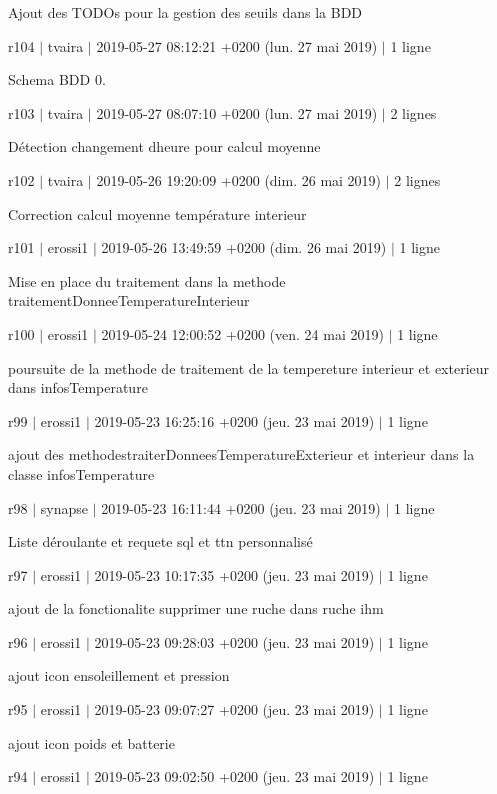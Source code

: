 Ajout des T\+O\+D\+Os pour la gestion des seuils dans la B\+DD

r104 $\vert$ tvaira $\vert$ 2019-\/05-\/27 08\+:12\+:21 +0200 (lun. 27 mai 2019) $\vert$ 1 ligne

Schema B\+DD 0.

r103 $\vert$ tvaira $\vert$ 2019-\/05-\/27 08\+:07\+:10 +0200 (lun. 27 mai 2019) $\vert$ 2 lignes

Détection changement d\textquotesingle{}heure pour calcul moyenne

r102 $\vert$ tvaira $\vert$ 2019-\/05-\/26 19\+:20\+:09 +0200 (dim. 26 mai 2019) $\vert$ 2 lignes

Correction calcul moyenne température interieur

r101 $\vert$ erossi1 $\vert$ 2019-\/05-\/26 13\+:49\+:59 +0200 (dim. 26 mai 2019) $\vert$ 1 ligne

Mise en place du traitement dans la methode traitement\+Donnee\+Temperature\+Interieur

r100 $\vert$ erossi1 $\vert$ 2019-\/05-\/24 12\+:00\+:52 +0200 (ven. 24 mai 2019) $\vert$ 1 ligne

poursuite de la methode de traitement de la tempereture interieur et exterieur dans infos\+Temperature

r99 $\vert$ erossi1 $\vert$ 2019-\/05-\/23 16\+:25\+:16 +0200 (jeu. 23 mai 2019) $\vert$ 1 ligne

ajout des methodestraiter\+Donnees\+Temperature\+Exterieur et interieur dans la classe infos\+Temperature

r98 $\vert$ synapse $\vert$ 2019-\/05-\/23 16\+:11\+:44 +0200 (jeu. 23 mai 2019) $\vert$ 1 ligne

Liste déroulante et requete sql et ttn personnalisé

r97 $\vert$ erossi1 $\vert$ 2019-\/05-\/23 10\+:17\+:35 +0200 (jeu. 23 mai 2019) $\vert$ 1 ligne

ajout de la fonctionalite supprimer une ruche dans ruche ihm

r96 $\vert$ erossi1 $\vert$ 2019-\/05-\/23 09\+:28\+:03 +0200 (jeu. 23 mai 2019) $\vert$ 1 ligne

ajout icon ensoleillement et pression

r95 $\vert$ erossi1 $\vert$ 2019-\/05-\/23 09\+:07\+:27 +0200 (jeu. 23 mai 2019) $\vert$ 1 ligne

ajout icon poids et batterie

r94 $\vert$ erossi1 $\vert$ 2019-\/05-\/23 09\+:02\+:50 +0200 (jeu. 23 mai 2019) $\vert$ 1 ligne

